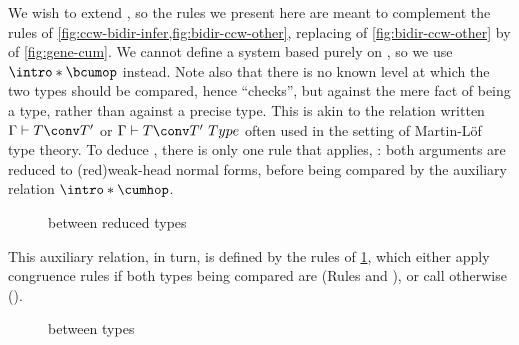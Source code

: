 We wish to extend , so the rules we present here are meant to complement
the rules of \cref{fig:ccw-bidir-infer,fig:bidir-ccw-other}, replacing 
of \cref{fig:bidir-ccw-other} by  of \cref{fig:gene-cum}.
We cannot define a system based purely on ,%
so we use  $\intro* \bcumop$ instead.
Note also that there is no known level at which the two types should be compared,
hence  “checks”, but against the mere
fact of being a type, rather than against a precise type. This is akin to the relation
written $\Gamma \vdash T \conv T'$ or $\Gamma \vdash T \conv T'\ Type$ often used in the
setting of Martin-Löf type theory.
To deduce ,
there is only one rule that applies, :
both arguments are reduced to \kl(red){weak-head} normal forms, before being compared
by the auxiliary relation $\intro* \cumhop$.

\begin{figure}[h]
  \ContinuedFloat
  \caption{ between reduced types}
  \label{fig:gene-cumh}
\end{figure}

This auxiliary relation, in turn, is defined by the rules of \cref{fig:gene-cumh}, which
either apply congruence rules if both types being compared are 
(Rules  and ), or call
 otherwise ().

\begin{figure*}[h]
  \ContinuedFloat
  \caption{ between types}
  \label{fig:gene-conv-ty}
\end{figure*}

